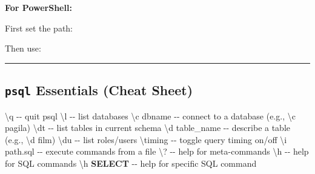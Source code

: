 \documentclass[
  letterpaper,
  DIV=11,
  numbers=noendperiod]{scrartcl}
\newenvironment{Shaded}{\begin{snugshade}}{\end{snugshade}}
\newcommand{\CommentTok}[1]{\textcolor[rgb]{0.37,0.37,0.37}{#1}}
\newcommand{\DecValTok}[1]{\textcolor[rgb]{0.68,0.00,0.00}{#1}}
\newcommand{\KeywordTok}[1]{\textcolor[rgb]{0.00,0.23,0.31}{\textbf{#1}}}
\newcommand{\NormalTok}[1]{\textcolor[rgb]{0.00,0.23,0.31}{#1}}
\newcommand{\OperatorTok}[1]{\textcolor[rgb]{0.37,0.37,0.37}{#1}}
\newcommand{\StringTok}[1]{\textcolor[rgb]{0.13,0.47,0.30}{#1}}
\newcommand{\VariableTok}[1]{\textcolor[rgb]{0.07,0.07,0.07}{#1}}
\begin{document}
\textbf{For PowerShell:}

First set the path:

\begin{Shaded}
\end{Shaded}

Then use:

\begin{Shaded}
\end{Shaded}

\begin{center}\rule{0.5\linewidth}{0.5pt}\end{center}

\subsection{\texorpdfstring{\texttt{psql} Essentials (Cheat
Sheet)}{psql Essentials (Cheat Sheet)}}\label{psql-essentials-cheat-sheet}

\begin{Shaded}
\begin{Highlighting}[]
\NormalTok{\textbackslash{}q                 }\CommentTok{{-}{-} quit psql}
\NormalTok{\textbackslash{}l                 }\CommentTok{{-}{-} list databases}
\NormalTok{\textbackslash{}c dbname          }\CommentTok{{-}{-} connect to a database (e.g., \textbackslash{}c pagila)}
\NormalTok{\textbackslash{}dt                }\CommentTok{{-}{-} list tables in current schema}
\NormalTok{\textbackslash{}d table\_name      }\CommentTok{{-}{-} describe a table (e.g., \textbackslash{}d film)}
\NormalTok{\textbackslash{}du                }\CommentTok{{-}{-} list roles/users}
\NormalTok{\textbackslash{}timing            }\CommentTok{{-}{-} toggle query timing on/off}
\NormalTok{\textbackslash{}i path.sql        }\CommentTok{{-}{-} execute commands from a file}
\NormalTok{\textbackslash{}?                 }\CommentTok{{-}{-} help for meta{-}commands}
\NormalTok{\textbackslash{}h                 }\CommentTok{{-}{-} help for SQL commands}
\NormalTok{\textbackslash{}h }\KeywordTok{SELECT}          \CommentTok{{-}{-} help for specific SQL command}
\end{Highlighting}
\end{Shaded}
\end{document}
